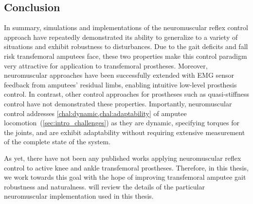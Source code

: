 \subsection{Conclusion} 
In summary, simulations and implementations of the neuromuscular reflex control
approach have repeatedly demonstrated its ability to generalize to a variety of
situations and exhibit robustness to disturbances. Due to the gait deficits and
fall risk transfemoral amputees face, these two properties make this control
paradigm very attractive for application to transfemoral prostheses. Moreover,
neuromuscular approaches have been successfully extended with EMG sensor
feedback from amputees' residual limbs, enabling intuitive low-level prosthesis
control. In contrast, other control approaches for prostheses such as
quasi-stiffness control have not demonstrated these properties. Importantly,
neuromuscular control addresses \cref{chal:dynamic,chal:adaptability} of amputee
locomotion~(\cref{sec:intro_challenges}) as they are dynamic, specifying torques
for the joints, and  are exhibit adaptability without requiring extensive
measurement of the complete state of the system. 

As yet, there have not been any published works applying neuromuscular reflex
control to active knee and ankle transfemoral prostheses. Therefore, in this
thesis, we work towards this goal with the hope of improving transfemoral
amputee gait robustness and naturalness.  will review the
details of the particular neuromuscular implementation used in this thesis.

